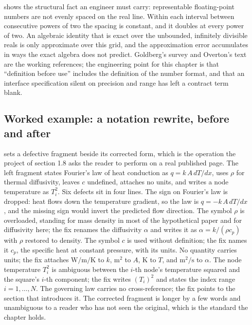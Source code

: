  shows the structural fact an
engineer must carry: representable floating-point numbers are not
evenly spaced on the real line. Within each interval between
consecutive powers of two the spacing is constant, and it doubles at
every power of two. An algebraic identity that is exact over the
unbounded, infinitely divisible reals is only approximate over this
grid, and the approximation error accumulates in ways the exact algebra
does not predict. Goldberg's survey \cite{text:goldberg1991-floating-point}
and Overton's text \cite{text:overton-ieee754} are the working
references; the engineering point for this chapter is that
``definition before use'' includes the definition of the number format,
and that an interface specification silent on precision and range has
left a contract term blank.

\subsection{Worked example: a notation rewrite, before and after}



 sets a defective fragment beside
its corrected form, which is the operation the project of section 1.8
asks the reader to perform on a real published page. The left fragment
states Fourier's law of heat conduction as $q = k\,A\,dT/dx$, uses
$\rho$ for thermal diffusivity, leaves $c$ undefined, attaches no
units, and writes a node temperature as $T_{i}^{2}$. Six defects sit
in four lines. The sign on Fourier's law is dropped: heat flows down
the temperature gradient, so the law is $q = -k\,A\,dT/dx$, and the
missing sign would invert the predicted flow direction. The symbol
$\rho$ is overloaded, standing for mass density in most of the
hypothetical paper and for diffusivity here; the fix renames the
diffusivity $\alpha$ and writes it as $\alpha = k/(\rho c_{p})$ with
$\rho$ restored to density. The symbol $c$ is used without definition;
the fix names it $c_{p}$, the specific heat at constant pressure, with
its units. No quantity carries units; the fix attaches
$\si{\watt\per\meter\per\kelvin}$ to $k$, $\si{\meter\squared}$ to $A$,
$\si{\kelvin}$ to $T$, and $\si{\meter\squared\per\second}$ to
$\alpha$. The node temperature $T_{i}^{2}$ is ambiguous between the
$i$-th node's temperature squared and the square's $i$-th component;
the fix writes $(T_{i})^{2}$ and states the index range $i = 1, \ldots,
N$. The governing law carries no cross-reference; the fix points to the
section that introduces it. The corrected fragment is longer by a few
words and unambiguous to a reader who has not seen the original, which
is the standard the chapter holds.

